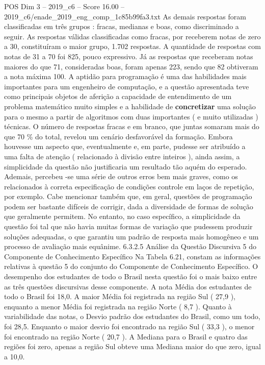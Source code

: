 \begin{textsample}{POS Dim 3 – 2019\_c6 – Score 16.00 – 2019\_c6/enade\_2019\_eng\_comp\_1c85b99fa3.txt}
As demais respostas foram classificadas em três grupos : fracas, medianas e boas, como discriminado a seguir.
As respostas válidas classificadas como fracas, por receberem notas de zero a 30, constituíram o maior grupo, 1.702 respostas.
A quantidade de respostas com notas de 31 a 70 foi 825, pouco expressivo.
Já as respostas que receberam notas maiores do que 71, consideradas boas, foram apenas 223, sendo que 82 obtiveram a nota máxima 100.
A aptidão para programação é uma das habilidades mais importantes para um engenheiro de computação, e a questão apresentada teve como principais objetos de aferição a capacidade de entendimento de um problema matemático muito simples e a habilidade de \textbf{concretizar} uma solução para o mesmo a partir de algoritmos com duas importantes ( e muito utilizadas ) técnicas.
O número de respostas fracas e em branco, que juntas somaram mais do que 70 \% do total, revelou um cenário desfavorável da formação.
Embora houvesse um aspecto que, eventualmente e, em parte, pudesse ser atribuído a uma falta de atenção ( relacionado à divisão entre inteiros ), ainda assim, a simplicidade da questão não justificaria um resultado tão aquém do esperado.
Ademais, percebeu -se uma série de outros erros bem mais graves, como os relacionados à correta especificação de condições controle em laços de repetição, por exemplo.
Cabe mencionar também que, em geral, questões de programação podem ser bastante difíceis de corrigir, dada a diversidade de formas de solução que geralmente permitem.
No entanto, no caso específico, a simplicidade da questão foi tal que não havia muitas formas de variação que pudessem produzir soluções adequadas, o que garantiu um padrão de resposta mais homogêneo e um processo de avaliação mais equânime. 6.3.2.5 Análise da Questão Discursiva 5 do Componente de Conhecimento Específico Na Tabela 6.21, constam as informações relativas à questão 5 do conjunto do Componente de Conhecimento Específico.
O desempenho dos estudantes de todo o Brasil nesta questão foi o mais baixo entre as três questões discursivas desse componente.
A nota Média dos estudantes de todo o Brasil foi 18,0.
A maior Média foi registrada na região Sul ( 27,9 ), enquanto a menor Média foi registrada na região Norte ( 8,7 ).
Quanto à variabilidade das notas, o Desvio padrão dos estudantes do Brasil, como um todo, foi 28,5.
Enquanto o maior desvio foi encontrado na região Sul ( 33,3 ), o menor foi encontrado na região Norte ( 20,7 ).
A Mediana para o Brasil e quatro das regiões foi zero, apenas a região Sul obteve uma Mediana maior do que zero, igual a 10,0.

\end{textsample}
